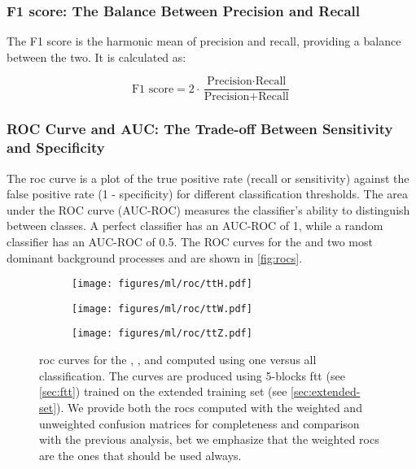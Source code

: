 \subsubsection{F1 score: The Balance Between Precision and Recall}

The F1 score is the harmonic mean of precision and recall, providing a balance between the two. It is calculated as:

\begin{equation}
    \text{F1 score} = 2 \cdot \frac{\text{Precision} \cdot \text{Recall}}{\text{Precision} + \text{Recall}}
\end{equation}

\subsubsection{ROC Curve and AUC: The Trade-off Between Sensitivity and Specificity}

The \gls{roc} curve is a plot of the true positive rate (recall or sensitivity) against
the false positive rate (1 - specificity) for different classification thresholds. The area under the ROC curve
(AUC-ROC) measures the classifier's ability to distinguish between classes. A perfect classifier has an AUC-ROC of 1,
while a random classifier has an AUC-ROC of 0.5. The ROC curves for the \tth and two most dominant background processes
\ttw and \ttz are shown in \autoref{fig:rocs}.

\begin{figure}[htb]
    \centering
    \begin{subfigure}{0.32\textwidth}
        \texttt{[image: figures/ml/roc/ttH.pdf]}
        \caption{\tth}
        \label{fig:roc-tth}
    \end{subfigure}
    \begin{subfigure}{0.32\textwidth}
        \texttt{[image: figures/ml/roc/ttW.pdf]}
        \caption{\ttw}
        \label{fig:roc-ttw}
    \end{subfigure}
    \begin{subfigure}{0.32\textwidth}
        \texttt{[image: figures/ml/roc/ttZ.pdf]}
        \caption{\ttz}
        \label{fig:roc-ttz}
    \end{subfigure}
    \caption[\acrshort{roc} curves for \tth, \ttz, and \ttz]
    {\gls{roc} curves for the \tth, \ttw, and \ttz computed using one versus all classification. The curves are produced
        using 5-blocks \gls{ftt} (see \autoref{sec:ftt}) trained on the extended training set (see
        \autoref{sec:extended-set}). We provide both the \glspl{roc} computed with the weighted and unweighted confusion
        matrices for completeness and comparison with the previous analysis, bet we emphasize
        that the weighted \glspl{roc} are the ones that should be used always.} \label{fig:rocs}
\end{figure}


